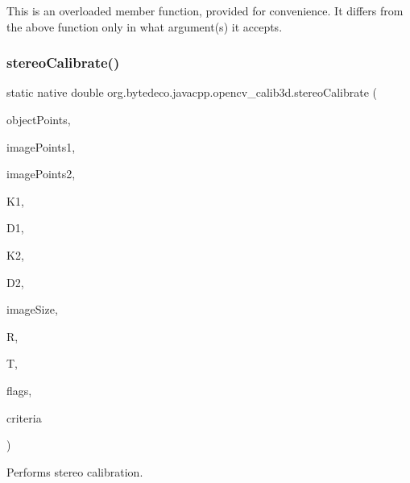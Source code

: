 This is an overloaded member function, provided for convenience. It differs from the above function only in what argument(s) it accepts. \mbox{\label{group__calib3d__fisheye_ga0134bbb31283b93ec8331c3b34923cd0}} 
\subsubsection{\texorpdfstring{stereo\+Calibrate()}{stereoCalibrate()}}
{\footnotesize\ttfamily static native double org.\+bytedeco.\+javacpp.\+opencv\+\_\+calib3d.\+stereo\+Calibrate (\begin{DoxyParamCaption}\item[{@By\+Val Mat\+Vector}]{object\+Points,  }\item[{@By\+Val Mat\+Vector}]{image\+Points1,  }\item[{@By\+Val Mat\+Vector}]{image\+Points2,  }\item[{@By\+Val Mat}]{K1,  }\item[{@By\+Val Mat}]{D1,  }\item[{@By\+Val Mat}]{K2,  }\item[{@By\+Val Mat}]{D2,  }\item[{@By\+Val Size}]{image\+Size,  }\item[{@By\+Val Mat}]{R,  }\item[{@By\+Val Mat}]{T,  }\item[{int}]{flags,  }\item[{@By\+Val(null\+Value=\char`\"{}cv\+::\+Term\+Criteria(cv\+::\+Term\+Criteria\+::\+C\+O\+U\+NT + cv\+::\+Term\+Criteria\+::\+E\+PS, 100, D\+B\+L\+\_\+\+E\+P\+S\+I\+L\+ON)\char`\"{}) Term\+Criteria}]{criteria }\end{DoxyParamCaption})\hspace{0.3cm}{\ttfamily [static]}}



Performs stereo calibration. 


